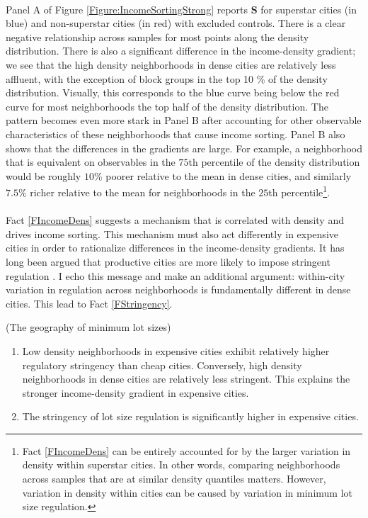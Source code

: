 \documentclass[12pt]{article}
\begin{document}
	\paragraph*{}
	Panel A of Figure \ref{Figure:IncomeSortingStrong} reports $\mathbf{S}$ for superstar cities (in blue) and non-superstar cities (in red) with excluded controls. There is a clear negative relationship across samples for most points along the density distribution. There is also a significant difference in the income-density gradient; we see that the high density neighborhoods in dense cities are relatively less affluent, with the exception of block groups in the top 10 \% of the density distribution. Visually, this corresponds to the blue curve being below the red curve for most neighborhoods the top half of the density distribution. The pattern becomes even more stark in Panel B after accounting for other observable characteristics of these neighborhoods that cause income sorting. Panel B also shows that the differences in the gradients are large. For example, a neighborhood that is equivalent on observables in the $75$th percentile of the density distribution would be roughly $10$\% poorer relative to the mean in dense cities, and similarly $7.5$\% richer relative to the mean for neighborhoods in the $25$th percentile\footnote{Fact \ref{FIncomeDens} can be entirely accounted for by the larger variation in density within superstar cities. In other words, comparing neighborhoods across samples that are at similar density quantiles matters. However, variation in density within cities can be caused by variation in minimum lot size regulation.}. 

	\paragraph*{} 
	Fact \ref{FIncomeDens} suggests a mechanism that is correlated with density and drives income sorting. This mechanism must also act differently in expensive cities in order to rationalize differences in the income-density gradients. It has long been argued that productive cities are more likely to impose stringent regulation \citep{HILBER2013,parkho, durantonpugaurbgrowth}. I echo this message and make an additional argument: within-city variation in regulation across neighborhoods is fundamentally different in dense cities. This lead to Fact \ref{FStringency}. 

	\begin{Fact}\label{FStringency}
		(The geography of minimum lot sizes)
		\begin{enumerate}
			\item  Low density neighborhoods in expensive cities exhibit relatively higher regulatory stringency than cheap cities. Conversely, high density neighborhoods in dense cities are relatively less stringent. This explains the stronger income-density gradient in expensive cities. 		
			\item  The stringency of lot size regulation is significantly higher in expensive cities. 
		\end{enumerate}
	\end{Fact}
	
\end{document}
